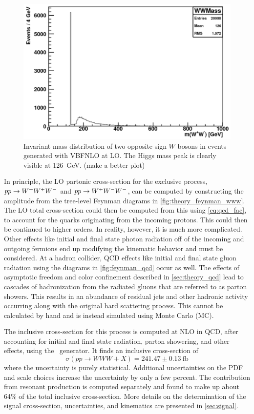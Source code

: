 \begin{figure}[ht]
\centering
\includegraphics[width=0.5\columnwidth]{figures/2l2j/mWW-parton.pdf}
\caption{ Invariant mass distribution of two opposite-sign $W$ bosons 
in \www events generated with VBFNLO at LO. The Higgs mass peak is clearly 
visible at 126~GeV. (make a better plot)}
\label{fig:mww_higgs}
\end{figure}



In principle, the LO partonic cross-section for the exclusive process, 
$pp\rightarrow\- W^{+}W^{+}W^{-}$ and $pp\rightarrow W^{+}W^{-}W^{-}$, 
can be computed by constructing the amplitude from the tree-level
Feynman diagrams in \fig\ref{fig:theory_feynman_www}.  
The LO total cross-section could then be computed
from this using \eqn\eqref{eq:qcd_fac}, to account for the quarks 
originating from the incoming protons.
This could then be continued to higher orders. 
In reality, however, it is much more complicated. 
Other effects like initial and final state photon radiation off of the incoming
and outgoing fermions end up modifying the kinematic behavior and must
be considered. At a hadron collider, QCD effects like initial and 
final state gluon radiation using the diagrams in \fig\ref{fig:feynman_qcd}
occur as well. The effects of asymptotic freedom and color confinement
described in \sec\ref{sec:theory_qcd} 
lead to cascades of hadronization from the radiated
gluons that are referred to as parton showers. This results in an 
abundance of residual jets and other hadronic activity occurring along
with the original hard scattering process. 
This cannot be calculated by hand and is instead simulated
using Monte Carlo (MC).


The inclusive cross-section for this process is computed at 
NLO in QCD, after accounting for initial and 
final state radiation, parton showering, and other effects,
using the \madgraph~generator. It finds an inclusive cross-section of 
\begin{equation}
\sigma(pp\rightarrow WWW + X) = 241.47 \pm 0.13~\textrm{fb}
\label{eq:www_total_xsec}
\end{equation}
where the uncertainty is purely statistical.
Additional uncertainties
on the PDF and scale choices increase the uncertainty by only a few
percent.
The contribution from resonant production is computed separately
and found to make up about 64\% of the 
total inclusive cross-section.
More details on the determination of the signal cross-section, uncertainties,
and kinematics are presented in \sec\ref{sec:signal}.

